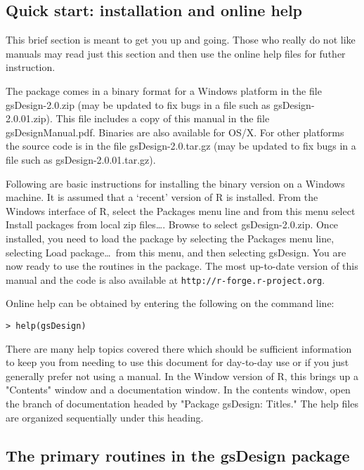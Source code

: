 \subsection{Quick start: installation and online help\label{sec:quickstart}}
This brief section is meant to get you up and going. Those who really do not like manuals may read just this section and then use the online help files for futher instruction.

The package comes in a binary format for a Windows platform in the file
gsDesign-2.0.zip (may be updated to fix bugs in a file such as
gsDesign-2.0.01.zip). This file includes a copy of this manual in the file
gsDesignManual.pdf. 
Binaries are also available for OS/X. For other platforms the source code is in the file gsDesign-2.0.tar.gz (may be updated to fix bugs in
a file such as gsDesign-2.0.01.tar.gz). 

Following are basic instructions for
installing the binary version on a Windows machine. It is assumed that a
`recent' version of R is installed. From the Windows interface of R, select
the Packages menu line and from this menu select Install packages from local
zip files\ldots. Browse to select gsDesign-2.0.zip. Once installed, you need
to load the package by selecting the Packages menu line, selecting Load
package\ldots\ from this menu, and then selecting gsDesign. You are now ready
to use the routines in the package. The most up-to-date version of this manual
and the code is also available at \texttt{http://r-forge.r-project.org}.

\bigskip

Online help can be obtained by entering the following on the command line:

\bigskip
\begin{verbatim}
> help(gsDesign)
\end{verbatim}
\bigskip

There are many help topics covered there which should be sufficient
information to keep you from needing to use this document for day-to-day use or if you just generally prefer not using a manual.
In the Window version of R, this brings up a "Contents" window and a
documentation window. In the contents window, open the branch of documentation
headed by "Package gsDesign: Titles." The help files are organized
sequentially under this heading. 

\subsection{The primary routines in the gsDesign package}
 
